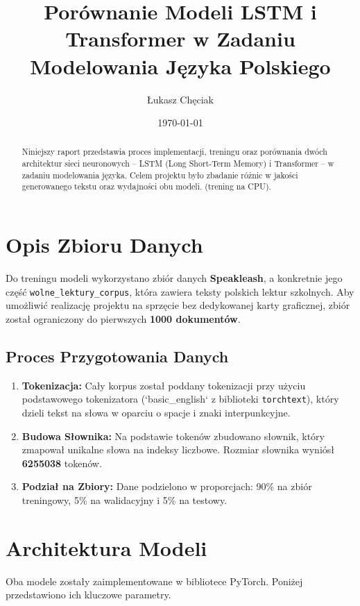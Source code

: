 \documentclass[11pt, a4paper]{article}
\title{Porównanie Modeli LSTM i Transformer w Zadaniu Modelowania Języka Polskiego}
\author{Łukasz Chęciak}
\date{\today}
\begin{document}
\maketitle

\begin{abstract}
Niniejszy raport przedstawia proces implementacji, treningu oraz porównania dwóch architektur sieci neuronowych – LSTM (Long Short-Term Memory) i Transformer – w zadaniu modelowania języka. Celem projektu było zbadanie różnic w jakości generowanego tekstu oraz wydajności obu modeli. (trening na CPU).
\end{abstract}

\section{Opis Zbioru Danych}

Do treningu modeli wykorzystano zbiór danych \textbf{Speakleash}, a konkretnie jego część \texttt{wolne\_lektury\_corpus}, która zawiera teksty polskich lektur szkolnych. Aby umożliwić realizację projektu na sprzęcie bez dedykowanej karty graficznej, zbiór został ograniczony do pierwszych \textbf{1000 dokumentów}.

\subsection{Proces Przygotowania Danych}
\begin{enumerate}
    \item \textbf{Tokenizacja:} Cały korpus został poddany tokenizacji przy użyciu podstawowego tokenizatora (`basic\_english` z biblioteki \texttt{torchtext}), który dzieli tekst na słowa w oparciu o spacje i znaki interpunkcyjne.
    \item \textbf{Budowa Słownika:} Na podstawie tokenów zbudowano słownik, który zmapował unikalne słowa na indeksy liczbowe. Rozmiar słownika wyniósł \textbf{6255038} tokenów.
    \item \textbf{Podział na Zbiory:} Dane podzielono w proporcjach: 90\% na zbiór treningowy, 5\% na walidacyjny i 5\% na testowy.
\end{enumerate}

\section{Architektura Modeli}

Oba modele zostały zaimplementowane w bibliotece PyTorch. Poniżej przedstawiono ich kluczowe parametry.
\end{document}
